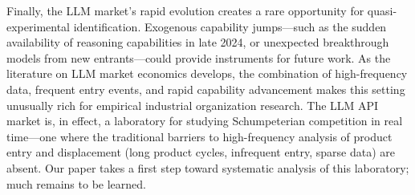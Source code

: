 \documentclass[11pt, a4paper]{article}
\begin{document}
Finally, the LLM market's rapid evolution creates a rare opportunity for quasi-experimental identification. Exogenous capability jumps---such as the sudden availability of reasoning capabilities in late 2024, or unexpected breakthrough models from new entrants---could provide instruments for future work. As the literature on LLM market economics develops, the combination of high-frequency data, frequent entry events, and rapid capability advancement makes this setting unusually rich for empirical industrial organization research. The LLM API market is, in effect, a laboratory for studying Schumpeterian competition in real time---one where the traditional barriers to high-frequency analysis of product entry and displacement (long product cycles, infrequent entry, sparse data) are absent. Our paper takes a first step toward systematic analysis of this laboratory; much remains to be learned.

\singlespacing

\end{document}
